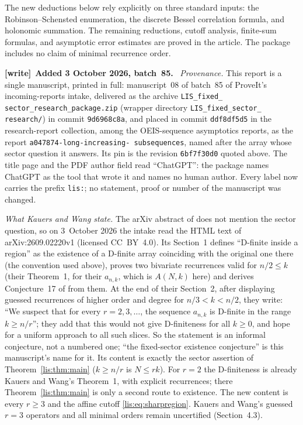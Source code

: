 \documentclass[11pt,letterpaper]{article}
\numberwithin{equation}{section}
\theoremstyle{definition}
\newenvironment{writenote}[1][]{\par\smallskip\begingroup\small
 \noindent\textbf{[write]}\if\relax\detokenize{#1}\relax\else~\textbf{#1.}\fi\ }%
 {\par\endgroup\smallskip}
\begin{document}
The new deductions below rely explicitly on three standard inputs:
the Robinson--Schensted enumeration, the discrete Bessel correlation
formula, and holonomic summation. The remaining reductions, cutoff
analysis, finite-sum formulas, and asymptotic error estimates are proved
in the article. The package includes no claim of minimal recurrence order.

\begin{writenote}[Added 3 October 2026, batch~85]
\emph{Provenance.} This report is a single manuscript, printed in full:
manuscript~08 of batch~85 of ProveIt's incoming-reports intake, delivered
as the archive \texttt{LIS\_\allowbreak fixed\_\allowbreak
sector\_\allowbreak research\_\allowbreak package.zip} (wrapper directory
\texttt{LIS\_\allowbreak fixed\_\allowbreak sector\_\allowbreak
research/}) in commit \texttt{9d6968c8a}, and placed in commit
\texttt{ddf8df5d5} in the research-report collection, among the
OEIS-sequence asymptotics reports, as the report
\texttt{a047874-\allowbreak long-\allowbreak increasing-\allowbreak
subsequences}, named after the array whose sector question it answers.
Its pin is the revision \texttt{6bf7f30d0} quoted above. The title page
and the PDF author field read ``ChatGPT'': the package names ChatGPT as
the tool that wrote it and names no human author. Every label now carries
the prefix \texttt{lis:}; no statement, proof or number of the manuscript
was changed.

\emph{What Kauers and Wang state.} The arXiv abstract of \cite{KW} does
not mention the sector question, so on 3~October 2026 the intake read the
HTML text of arXiv:2609.02220v1 (licensed CC~BY~4.0). Its Section~1
defines ``D-finite inside a region'' as the existence of a D-finite array
coinciding with the original one there (the convention used above),
proves two bivariate recurrences valid for $n/2\le k$ (their Theorem~1,
for their $a_{n,k}$, which is $A(N,k)$ here) and derives
Conjecture~17 of \cite{KK} from them. At the end of their Section~2,
after displaying guessed recurrences of higher order and degree for
$n/3<k<n/2$, they write: ``We suspect that for every $r=2,3,\dots$, the
sequence $a_{n,k}$ is D-finite in the range $k\geq n/r$''; they add that
this would not give D-finiteness for all $k\ge0$, and hope for a uniform
approach to all such slices. So the statement is an informal conjecture,
not a numbered one; ``the fixed-sector existence conjecture'' is this
manuscript's name for it. Its content is exactly the sector assertion of
Theorem~\ref{lis:thm:main} ($k\ge n/r$ is $N\le rk$). For $r=2$ the
D-finiteness is already Kauers and Wang's Theorem~1, with explicit
recurrences; there Theorem~\ref{lis:thm:main} is only a second route to
existence. The new content is every $r\ge3$ and the affine cutoff
\eqref{lis:eq:sharpregion}. Kauers and Wang's guessed $r=3$ operators and
all minimal orders remain uncertified (Section~4.3).


\end{writenote}
\end{document}
